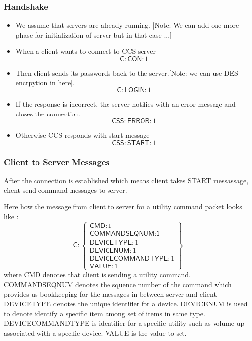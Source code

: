 \subsubsection{Handshake}
\label{sec:pdus:pdu:hs}
\begin{itemize}
\item We assume that servers are already running. [Note: We can add one more phase for initialization of server but in that case ...]
\item When a client wants to connect to \textsf{CCS} server
  \[ \textsf{C} : \textsf{CON} : 1\]

  \item Then client sends its passwords back to the server.[Note: we can use DES encrpytion in here]. 
    \[\textsf{C} : \textsf{LOGIN} : 1\]
  \item If the response is incorrect, the server notifies with an error message and closes the connection:
    \[\textsf{CSS}:\textsf{ERROR}:1\]
    \item Otherwise \textsf{CCS} responds with start message
      \[\textsf{CSS} : \textsf{START} : 1\]
    \end{itemize}

\subsubsection{Client to Server Messages}
\label{sec:pdus:pdu:c_to_s}

After the connection is established which means client takes \textsf{START} messassage, client send command messages to server. 

Here how the message from client to server for a utility command packet looks like :
\[
\textsf{C}:\left\{ \begin{array}{ll}  \textsf{CMD}:1\\
                                      \textsf{COMMANDSEQNUM:1}\\
                                      \textsf{DEVICETYPE}:1 \\
                                       \textsf{DEVICENUM}:1 \\
                                      \textsf{DEVICECOMMANDTYPE}:1 \\
                                        \textsf{VALUE}:1

           \end{array} \right\}
\]                                        
where \textsf{CMD} denotes that client is sending a utility command. \textsf{COMMANDSEQNUM} denotes the squence number of the command which provides us bookkeeping for the messages in between server and client. \textsf{DEVICETYPE} denotes the unique identifier for a device. \textsf{DEVICENUM} is used to denote identify a specific item among set of items in same type. \textsf{DEVICECOMMANDTYPE} is identifier for a specific utility such as volume-up associated with a specific device. \textsf{VALUE} is the value to set.


